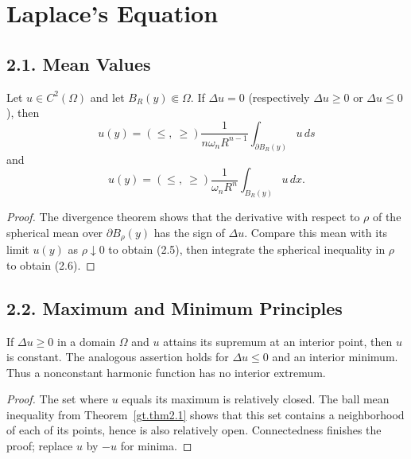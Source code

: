 \chapter{Laplace's Equation}

\section*{2.1. Mean Values}

\begin{theorem}\label{gt.thm2.1}
Let $u\in C^2(\Omega)$ and let $B_R(y)\Subset\Omega$. If
$\Delta u=0$ (respectively $\Delta u\geq0$ or $\Delta u\leq0$), then
\begin{equation}
\tag{2.5}
u(y)=(\leq,\ \geq)\frac{1}{n\omega_nR^{n-1}}
\int_{\partial B_R(y)}u\,ds
\end{equation}
and
\begin{equation}
\tag{2.6}
u(y)=(\leq,\ \geq)\frac{1}{\omega_nR^n}
\int_{B_R(y)}u\,dx.
\end{equation}
\end{theorem}
\begin{proof}
\sketch The divergence theorem shows that the derivative with respect to
$\rho$ of the spherical mean over $\partial B_\rho(y)$ has the sign of
$\Delta u$. Compare this mean with its limit $u(y)$ as $\rho\downarrow0$ to
obtain (2.5), then integrate the spherical inequality in $\rho$ to obtain
(2.6).
\end{proof}

\section*{2.2. Maximum and Minimum Principles}

\begin{theorem}\label{gt.thm2.2}
If $\Delta u\geq0$ in a domain $\Omega$ and $u$ attains its supremum at an
interior point, then $u$ is constant. The analogous assertion holds for
$\Delta u\leq0$ and an interior minimum. Thus a nonconstant harmonic
function has no interior extremum.
\end{theorem}
\begin{proof}
\sketch The set where $u$ equals its maximum is relatively closed. The ball
mean inequality from Theorem~\ref{gt.thm2.1} shows that this set contains a
neighborhood of each of its points, hence is also relatively open. Connectedness
finishes the proof; replace $u$ by $-u$ for minima.
\end{proof}

